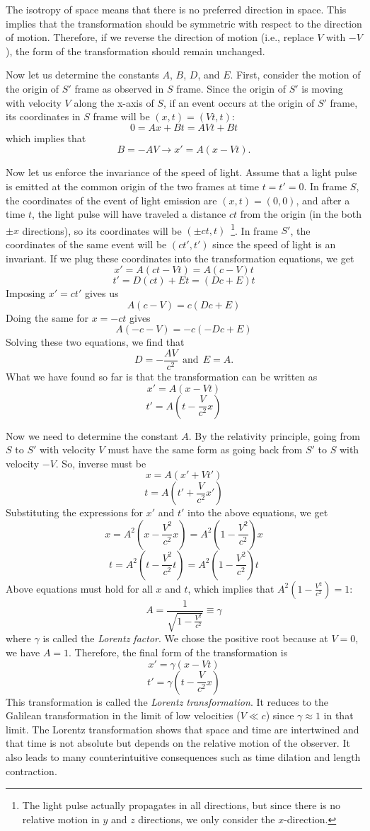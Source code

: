 \documentclass[12pt]{article}
\begin{document}
The isotropy of space means that there is no preferred direction in space. This implies that the transformation should be symmetric with respect to the direction of motion. Therefore, if we reverse the direction of motion (i.e., replace $V$ with $-V$), the form of the transformation should remain unchanged. 


Now let us determine the constants $A$, $B$, $D$, and $E$. First, consider the motion of the origin of $S'$ frame as observed in $S$ frame. Since the origin of $S'$ is moving with velocity $V$ along the x-axis of $S$, if an event occurs at the origin of $S'$ frame, its coordinates in $S$ frame will be $(x,t)=(Vt,t)$:
\[0=Ax + Bt = AVt + Bt\]
which implies that
\[B = -AV \rightarrow x' = A(x - Vt).
\]


Now let us enforce the invariance of the speed of light. Assume that a light pulse is emitted at the common origin of the two frames at time $t=t'=0$. In frame $S$, the coordinates of the event of light emission are $(x,t)=(0,0)$, and after a time $t$, the light pulse will have traveled a distance $ct$ from the origin (in the both $\pm x$ directions), so its coordinates will be $(\pm ct,t)$~\footnote{The light pulse actually propagates in all directions, but since there is no relative motion in $y$ and $z$ directions, we only consider the $x$-direction.}. In frame $S'$, the coordinates of the same event will be $(ct',t')$ since the speed of light is an invariant. If we plug these coordinates into the transformation equations, we get
\[x' = A(ct - Vt) = A(c-V)t\]
\[t' = D(ct) + Et = (Dc+E)t
\]
Imposing $x' = ct'$ gives us
\[A(c-V) = c(Dc + E)\]
Doing the same for $x=-ct$ gives
\[A(-c-V) = -c(-Dc + E)\]
Solving these two equations, we find that
\[
D=-\frac{AV}{c^2}~~ \text{and} ~~E=A.
\]
What we have found so far is that the transformation can be written as
\[x' = A(x - Vt)
\]
\[t' = A\left(t - \frac{V}{c^2}x\right)
\]

Now we need to determine the constant $A$. By the relativity principle, going from $S$ to $S'$ with velocity $V$ must have the same form as going back from $S'$ to $S$ with velocity $-V$. So, inverse must be 
\[x = A(x' + Vt')
\]
\[t = A\left(t' + \frac{V}{c^2}x'\right)
\]
Substituting the expressions for $x'$ and $t'$ into the above equations, we get
\[x = A^2\left(x - \frac{V^2}{c^2}x\right) = A^2\left(1 - \frac{V^2}{c^2}\right)x\]
\[t = A^2\left(t - \frac{V^2}{c^2}t\right) = A^2\left(1 - \frac{V^2}{c^2}\right)t   \]  
Above equations must hold for all $x$ and $t$, which implies that $A^2(1 - \frac{V^2}{c^2}) = 1$:
\[A = \frac{1}{\sqrt{1 - \frac{V^2}{c^2}}} \equiv \gamma
\]
where $\gamma$ is called the \textit{Lorentz factor}. We chose the positive root because at $V=0$, we have $A=1$. Therefore, the final form of the transformation is
\[x' = \gamma(x - Vt)
\]
\[t' = \gamma\left(t - \frac{V}{c^2}x\right)
\]
This transformation is called the \textit{Lorentz transformation}. It reduces to the Galilean transformation in the limit of low velocities ($V \ll c$) since $\gamma \approx 1$ in that limit. The Lorentz transformation shows that space and time are intertwined and that time is not absolute but depends on the relative motion of the observer. It also leads to many counterintuitive consequences such as time dilation and length contraction.
\end{document}
